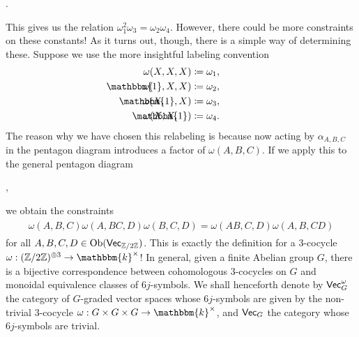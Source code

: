 \begin{example}
\begin{center}
\begin{tikzcd}[arrows={|->}, row sep=1.2cm, column sep=2cm]
\end{tikzcd}.
\end{center}
\newpage
\noindent This gives us the relation $\omega_1^2\omega_3 = \omega_2\omega_4$. However, there could be more constraints on these constants! As it turns out, though, there is a simple way of determining these. Suppose we use the more insightful labeling convention
\begin{align*}
\begin{split}
\omega(X, X, X) &\coloneqq \omega_1,\\
\omega(\nhphantom{${\mathbbm{1}}$}\hphantom{X}{\mathbbm{1}}, X, X) &\coloneqq \omega_2,\\
\omega(X, \nhphantom{${\mathbbm{1}}$}\hphantom{X}{\mathbbm{1}}, X) &\coloneqq \omega_3,\\
\omega(X, X, \nhphantom{${\mathbbm{1}}$}\hphantom{X}{\mathbbm{1}}) &\coloneqq \omega_4.
\end{split}
\end{align*}
\noindent The reason why we have chosen this relabeling is because now acting by $\alpha_{A, B, C}$ in the pentagon diagram introduces a factor of $\omega(A, B, C)$. If we apply this to the general pentagon diagram
\begin{center}
,
\end{center}
\noindent we obtain the constraints
\begin{align*}
\begin{split}
\omega(A, B, C)\omega(A, BC, D)\omega(B, C, D) = \omega(AB, C, D)\omega(A, B, CD)
\end{split}
\end{align*}
\noindent for all $A, B, C, D \in \textup{Ob}(\textup{\textsf{Vec}}_{\mathbb{Z}/2\mathbb{Z}})$. This is exactly the definition for a $3$-cocycle $\omega : (\mathbb{Z}/2\mathbb{Z})^{\oplus 3} \to \mathbbm{k}^\times$! In general, given a finite Abelian group $G$, there is a bijective correspondence between cohomologous $3$-cocycles on $G$ and monoidal equivalence classes of $6j$-symbols. We shall henceforth denote by $\textup{\textsf{Vec}}_G^\omega$ the category of $G$-graded vector spaces whose $6j$-symbols are given by the non-trivial $3$-cocycle $\omega : G \times G \times G \to \mathbbm{k}^\times$, and $\textup{\textsf{Vec}}_G$ the category whose $6j$-symbols are trivial.\\
\end{example}

